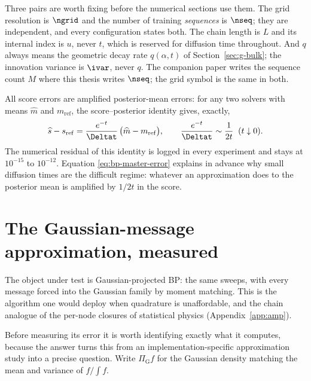 \begin{remark}
Three pairs are worth fixing before the numerical sections use them. The grid
resolution is $\ngrid$ and the number of training \emph{sequences} is $\nseq$;
they are independent, and every configuration states both. The chain length is
$L$ and its internal index is $u$, never $t$, which is reserved for diffusion
time throughout. And $q$ always means the geometric decay rate $q(\alpha,t)$
of Section~\ref{sec:g-bulk}; the innovation variance is $\ivar$, never $q$.
The companion paper writes the sequence count $M$ where this thesis writes
$\nseq$; the grid symbol is the same in both.
\end{remark}

All score errors are amplified posterior-mean errors: for any two solvers
with means $\widehat m$ and $m_{\mathrm{ref}}$, the score--posterior
identity gives, exactly,
\begin{equation}
  \widehat s - s_{\mathrm{ref}}
  = \frac{e^{-t}}{\Deltat}\,
    \big( \widehat m - m_{\mathrm{ref}} \big),
  \qquad
  \frac{e^{-t}}{\Deltat} \sim \frac{1}{2t} \;\; (t \downarrow 0).
  \label{eq:bp-master-error}
\end{equation}
The numerical residual of this identity is logged in every experiment and
stays at $10^{-15}$ to $10^{-12}$. Equation \eqref{eq:bp-master-error}
explains in advance why small diffusion times are the difficult regime:
whatever an approximation does to the posterior mean is amplified by
$1/2t$ in the score.

\section{The Gaussian-message approximation, measured}\label{sec:l-closure}

The object under test is Gaussian-projected BP: the same sweeps, with
every message forced into the Gaussian family by moment matching. This is
the algorithm one would deploy when quadrature is unaffordable, and the
chain analogue of the per-node closures of statistical physics
(Appendix~\ref{app:amp}).

Before measuring its error it is worth identifying exactly what it computes,
because the answer turns this from an implementation-specific approximation
study into a precise question. Write $\Pi_{\mathrm{G}} f$ for the Gaussian
density matching the mean and variance of $f/\!\int\! f$.

